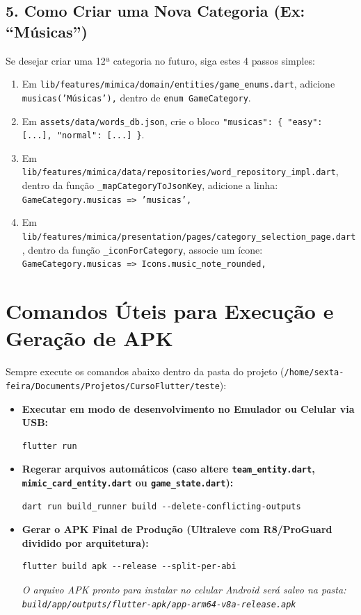 \documentclass[12pt,a4paper]{article}
\begin{document}
\subsection{5. Como Criar uma Nova Categoria (Ex: ``Músicas'')}
Se desejar criar uma 12ª categoria no futuro, siga estes 4 passos simples:
\begin{enumerate}
  \item Em \texttt{lib/features/mimica/domain/entities/game\_enums.dart}, adicione \texttt{musicas('Músicas'),} dentro de \texttt{enum GameCategory}.
  \item Em \texttt{assets/data/words\_db.json}, crie o bloco \texttt{"musicas": \{ "easy": [...], "normal": [...] \}}.
  \item Em \texttt{lib/features/mimica/data/repositories/word\_repository\_impl.dart}, dentro da função \texttt{\_mapCategoryToJsonKey}, adicione a linha:
  \texttt{GameCategory.musicas => 'musicas',}
  \item Em \texttt{lib/features/mimica/presentation/pages/category\_selection\_page.dart}, dentro da função \texttt{\_iconForCategory}, associe um ícone:
  \texttt{GameCategory.musicas => Icons.music\_note\_rounded,}
\end{enumerate}

\section{Comandos Úteis para Execução e Geração de APK}

Sempre execute os comandos abaixo dentro da pasta do projeto (\texttt{/home/sexta-feira/Documents/Projetos/CursoFlutter/teste}):

\begin{itemize}
  \item \textbf{Executar em modo de desenvolvimento no Emulador ou Celular via USB:}
\begin{lstlisting}
flutter run
\end{lstlisting}

  \item \textbf{Regerar arquivos automáticos (caso altere \texttt{team\_entity.dart}, \texttt{mimic\_card\_entity.dart} ou \texttt{game\_state.dart}):}
\begin{lstlisting}
dart run build_runner build --delete-conflicting-outputs
\end{lstlisting}

  \item \textbf{Gerar o APK Final de Produção (Ultraleve com R8/ProGuard dividido por arquitetura):}
\begin{lstlisting}
flutter build apk --release --split-per-abi
\end{lstlisting}
  \textit{O arquivo APK pronto para instalar no celular Android será salvo na pasta:\\
  \texttt{build/app/outputs/flutter-apk/app-arm64-v8a-release.apk}}
\end{itemize}
\end{document}
